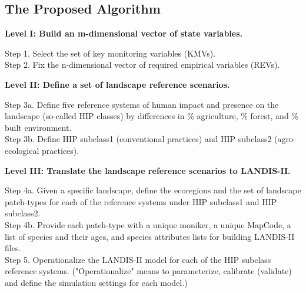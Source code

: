 \documentclass[noback]{psuposter}
\begin{document}
\subsection{The Proposed Algorithm}
\textbf{Level I: Build an m-dimensional vector of state variables.}
\begin{adjustwidth}{1cm}{}
{\small  Step 1. Select the set of key monitoring variables (KMVs).\\
Step 2. Fix the n-dimensional vector of required empirical variables (REVs).
}
\end{adjustwidth}
\textbf{Level II: Define a set of landscape reference scenarios.}
\begin{adjustwidth}{1cm}{}
{\small Step 3a. Define five reference systems of human impact and presence on the landscape (so-called HIP classes) by differences in \% agriculture, \% forest, and \% built environment.\\
Step 3b. Define HIP subclass1 (conventional practices) and HIP subclass2 (agro-ecological practices).
}
\end{adjustwidth}
\textbf{Level III: Translate the landscape reference scenarios to LANDIS-II.}
\begin{adjustwidth}{1cm}{}
{\small Step 4a. Given a specific landscape, define the ecoregions and the set of landscape patch-types for each of the reference systems under HIP subclass1 and HIP subclass2.\\
Step 4b. Provide each patch-type with a unique moniker, a unique MapCode, a list of species and their ages, and species attributes lists for building LANDIS-II files.\\
Step 5. Operationalize the LANDIS-II model for each of the HIP subclass reference systems. ("Operationalize" means to parameterize, calibrate (validate) and define the simulation settings for each model.)
}
\end{adjustwidth}

\columnbreak
\end{document}

